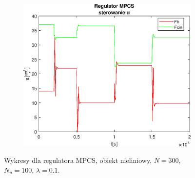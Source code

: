 \begin{figure}[h!]
   \begin{subfigure}[b]{0.4\textwidth}
      \includegraphics[width=1\linewidth]{img/MPCSanaRK/MPCSRKControlN300Nu100l10.eps}
      \caption{}
      \label{fig:fig:MPCSRKN300Nu100l103}
   \end{subfigure}
       
   \caption{Wykresy dla regulatora MPCS, obiekt nieliniowy, $N = 300$, $N_u = 100$, $\lambda = 0.1$.}
   \label{fig:MPCSRKN300Nu100l10}
\end{figure}
           
